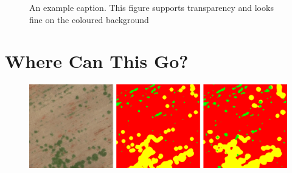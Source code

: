 \documentclass[
    ,title     = {{Image Segmentation for Smart Agriculture}}
    ,subject   = {{This is the subject of my work}}
    ,papersize = {{a1paper}}
    ,nocrop
]{dtuposter}
\begin{document}
\begin{dtupostercontent}

\begin{figure}
	\centering
{}
\caption{An example caption. This figure supports transparency and looks fine on 
the coloured background}\label{fig:example}
\end{figure}



\section{Where Can This Go?}

\begin{figure}
	\begin{center}
			\includegraphics[width=\linewidth,origin=c]{reconst}
	\end{center}
\end{figure}


\end{dtupostercontent}
\end{document}
